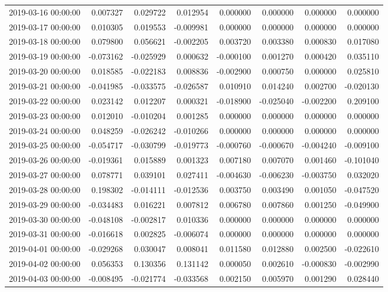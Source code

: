 \begin{tabular}{lrrrrrrr}
2019-03-16 00:00:00 & 0.007327 & 0.029722 & 0.012954 & 0.000000 & 0.000000 & 0.000000 & 0.000000 \\
2019-03-17 00:00:00 & 0.010305 & 0.019553 & -0.009981 & 0.000000 & 0.000000 & 0.000000 & 0.000000 \\
2019-03-18 00:00:00 & 0.079800 & 0.056621 & -0.002205 & 0.003720 & 0.003380 & 0.000830 & 0.017080 \\
2019-03-19 00:00:00 & -0.073162 & -0.025929 & 0.000632 & -0.000100 & 0.001270 & 0.000420 & 0.035110 \\
2019-03-20 00:00:00 & 0.018585 & -0.022183 & 0.008836 & -0.002900 & 0.000750 & 0.000000 & 0.025810 \\
2019-03-21 00:00:00 & -0.041985 & -0.033575 & -0.026587 & 0.010910 & 0.014240 & 0.002700 & -0.020130 \\
2019-03-22 00:00:00 & 0.023142 & 0.012207 & 0.000321 & -0.018900 & -0.025040 & -0.002200 & 0.209100 \\
2019-03-23 00:00:00 & 0.012010 & -0.010204 & 0.001285 & 0.000000 & 0.000000 & 0.000000 & 0.000000 \\
2019-03-24 00:00:00 & 0.048259 & -0.026242 & -0.010266 & 0.000000 & 0.000000 & 0.000000 & 0.000000 \\
2019-03-25 00:00:00 & -0.054717 & -0.030799 & -0.019773 & -0.000760 & -0.000670 & -0.004240 & -0.009100 \\
2019-03-26 00:00:00 & -0.019361 & 0.015889 & 0.001323 & 0.007180 & 0.007070 & 0.001460 & -0.101040 \\
2019-03-27 00:00:00 & 0.078771 & 0.039101 & 0.027411 & -0.004630 & -0.006230 & -0.003750 & 0.032020 \\
2019-03-28 00:00:00 & 0.198302 & -0.014111 & -0.012536 & 0.003750 & 0.003490 & 0.001050 & -0.047520 \\
2019-03-29 00:00:00 & -0.034483 & 0.016221 & 0.007812 & 0.006780 & 0.007860 & 0.001250 & -0.049900 \\
2019-03-30 00:00:00 & -0.048108 & -0.002817 & 0.010336 & 0.000000 & 0.000000 & 0.000000 & 0.000000 \\
2019-03-31 00:00:00 & -0.016618 & 0.002825 & -0.006074 & 0.000000 & 0.000000 & 0.000000 & 0.000000 \\
2019-04-01 00:00:00 & -0.029268 & 0.030047 & 0.008041 & 0.011580 & 0.012880 & 0.002500 & -0.022610 \\
2019-04-02 00:00:00 & 0.056353 & 0.130356 & 0.131142 & 0.000050 & 0.002610 & -0.000830 & -0.002990 \\
2019-04-03 00:00:00 & -0.008495 & -0.021774 & -0.033568 & 0.002150 & 0.005970 & 0.001290 & 0.028440 \\

\end{tabular}
